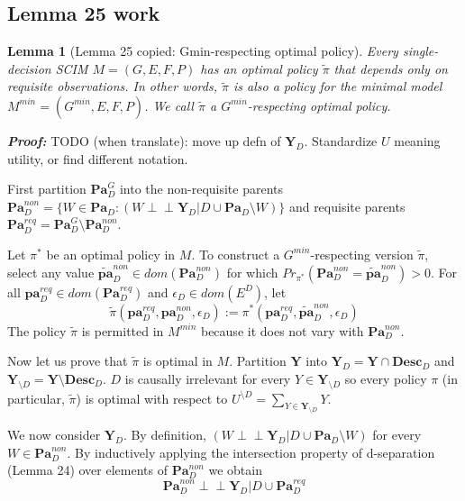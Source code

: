 \documentclass[letterpaper,10pt]{article}
\newtheorem{lemma}[theorem]{Lemma}
\newcommand\indep{\perp \!\!\! \perp}
\begin{document}
\subsection{Lemma 25 work}

\begin{lemma}[Lemma 25 copied: Gmin-respecting optimal policy]\label{lemma25:copy}
Every single-decision SCIM $M=(G,E,F,P)$ has an optimal policy $\tilde{\pi}$ that depends only on requisite observations. In other words, $\tilde{\pi}$ is also a policy for the minimal model $M^{min}=(G^{min},E,F,P)$. We call $\tilde{\pi}$ a $G^{min}$-respecting optimal policy.
\end{lemma}

\textbf{\emph{Proof:}}
\color{red} TODO (when translate): move up defn of $\mathbf{Y}_D$. Standardize $U$ meaning utility, or find different notation. \color{black}

First partition $\mathbf{Pa}_D^G$ into the non-requisite parents $\mathbf{Pa}^{non}_D=\{W\in \mathbf{Pa}_D : (W\indep \mathbf{Y}_D | D \cup \mathbf{Pa}_D \setminus W)\}$ and requisite parents $\mathbf{Pa}_D^{req}=\mathbf{Pa}_D^G\setminus\mathbf{Pa}^{non}_D$.

Let $\pi^*$ be an optimal policy in $M$.
To construct a $G^{min}$-respecting version $\tilde{\pi}$, select any value $\mathbf{\tilde{pa}}^{non}_D \in dom(\mathbf{Pa}^{non}_D)$ for which $Pr_{\pi^*}(\mathbf{Pa}^{non}_D = \mathbf{\tilde{pa}}^{non}_D)>0$.
For all $\mathbf{pa}_D^{req} \in dom(\mathbf{Pa}_D^{req})$ and $\epsilon_D \in dom(E^D)$, let
\[
\tilde{\pi}(\mathbf{pa}_D^{req},\mathbf{pa}^{non}_D,\epsilon_D) := \pi^*(\mathbf{pa}_D^{req},\mathbf{\tilde{pa}}^{non}_D,\epsilon_D)
\]
The policy $\tilde{\pi}$ is permitted in $M^{min}$ because it does not vary with $\mathbf{Pa}^{non}_D$.

Now let us prove that $\tilde{\pi}$ is optimal in $M$.
Partition $\mathbf{Y}$ into $\mathbf{Y}_D=\mathbf{Y}\cap \textbf{Desc}_D$ and $\mathbf{Y}_{\setminus D}=\mathbf{Y}\setminus \textbf{Desc}_D$.
$D$ is causally irrelevant for every $Y\in\mathbf{Y}_{\setminus D}$ so every policy $\pi$ (in particular, $\tilde{\pi}$) is optimal with respect to $U^{\setminus D}=\sum_{Y\in\mathbf{Y}_{\setminus D}}Y$.

We now consider $\mathbf{Y}_D$.
By definition, $(W\indep \mathbf{Y}_D | D \cup \mathbf{Pa}_D \setminus W)$ for every $W\in \mathbf{Pa}^{non}_D$.
By inductively applying the intersection property of d-separation (Lemma 24) over elements of $\mathbf{Pa}^{non}_D$ we obtain
\begin{equation}\label{intersected0}
\mathbf{Pa}^{non}_D \indep \mathbf{Y}_D | D \cup \mathbf{Pa}^{req}_D
\end{equation}
\end{document}
